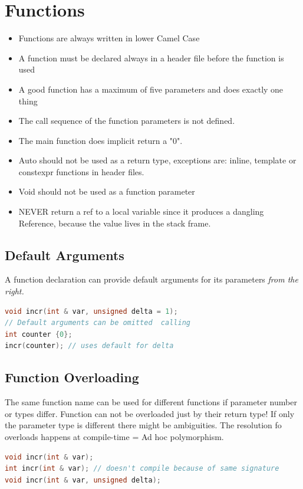 
\section{Functions}
\begin{itemize}
  \itemsep -0.5em 
  \item Functions are always written in lower Camel Case
  \item A function must be declared always in a header file before the function is used
  \item A good function has a maximum of five parameters and does exactly one thing
  \item The call sequence of the function parameters is not defined.
  \item The main function does implicit return a "0".
  \item Auto should not be used as a return type, exceptions are: inline, template or constexpr functions in header files.
  \item Void should not be used as a function parameter
  \item NEVER return a ref to a local variable since it produces a dangling Reference, because the value lives in the stack frame.
\end{itemize}

\subsection{Default Arguments}
A function declaration can provide default arguments for its parameters \textit{from the right.}
\begin{lstlisting}[language=C++]
void incr(int & var, unsigned delta = 1);
// Default arguments can be omitted  calling
int counter {0};
incr(counter); // uses default for delta
\end{lstlisting}

\subsection{Function Overloading}
The same function name can be used for different functions if parameter number or types differ. Function can not be overloaded just by their return type! If only the parameter type is different there might be ambiguities. The resolution fo overloads happens at compile-time = Ad hoc polymorphism.
\begin{lstlisting}[language=C++]
void incr(int & var);
int incr(int & var); // doesn't compile because of same signature
void incr(int & var, unsigned delta);
\end{lstlisting}

